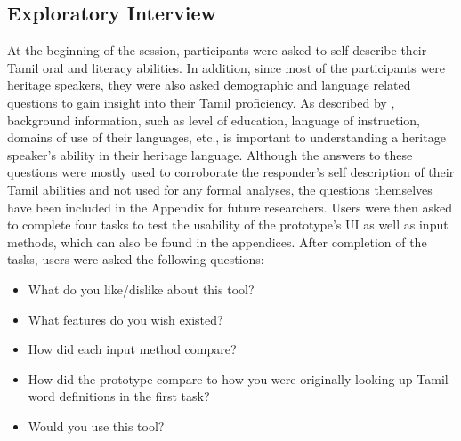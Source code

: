 \documentclass[11pt]{article}
\begin{document}
\subsection{Exploratory Interview}
At the beginning of the session, participants were asked to self-describe their 
Tamil oral and literacy abilities. In addition, since most of the participants were heritage speakers, 
they were also asked demographic and language related questions to gain insight into their Tamil proficiency. 
As described by \citet{montrul_heritage_2016}, background information, 
such as level of education, language of instruction, domains of use of their languages, etc., 
is important to understanding a heritage speaker’s ability in their heritage language.
Although the answers to these questions were mostly used to corroborate the 
responder’s self description of their Tamil abilities and not used for any formal analyses, 
the questions themselves have been included in the Appendix for future researchers.
Users were then asked to complete four tasks to test the usability of the prototype’s UI as well as input methods, 
which can also be found in the appendices. 
After completion of the tasks, users were asked the following questions:
\begin{itemize}
  \item What do you like/dislike about this tool?
  \item What features do you wish existed?
  \item How did each input method compare?
  \item How did the prototype compare to how you were originally looking up Tamil word definitions in the first task?
  \item Would you use this tool?
\end{itemize}
\end{document}
